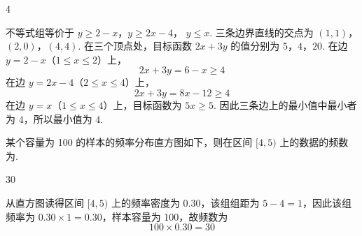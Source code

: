 \begin{answer}
4
\end{answer}

\begin{solution}
不等式组等价于 \(y\geqslant2-x\)，\(y\geqslant2x-4\)，
\(y\leqslant x\).
三条边界直线的交点为
\((1,1)\)，\((2,0)\)，\((4,4)\).
在三个顶点处，目标函数 \(2x+3y\) 的值分别为
\(5\)，\(4\)，\(20\).
在边 \(y=2-x\)（\(1\le x\le2\)）上，
\[
2x+3y=6-x\ge4
\]
在边 \(y=2x-4\)（\(2\le x\le4\)）上，
\[
2x+3y=8x-12\ge4
\]
在边 \(y=x\)（\(1\le x\le4\)）上，目标函数为 \(5x\ge5\).
因此三条边上的最小值中最小者为 \(4\)，所以最小值为 \(4\).
\end{solution}

\begin{problem}
某个容量为 100 的样本的频率分布直方图如下，则在区间 \([4, 5)\) 上的数据的频数为\fillinblank{}.

\end{problem}

\begin{answer}
30
\end{answer}

\begin{solution}
从直方图读得区间 \([4,5)\) 上的频率密度为 \(0.30\)，该组组距为
\(5-4=1\)，因此该组频率为 \(0.30\times1=0.30\)，样本容量为
100，故频数为
\[
100\times0.30=30
\]
\end{solution}

